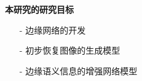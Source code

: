 \documentclass[CJK,aspectratio=169]{beamer}  %
\begin{document}
	\begin{frame}
		{ \yahei \textbf{本研究的研究目标}}
		
		\begin{itemize}
			\item [-]
			边缘网络的开发
			
			\vspace{-0.05cm}
			
			\item [-]
			初步恢复图像的生成模型
	
			\vspace{-0.05cm}
			
			\item [-]
			边缘语义信息的增强网络模型
		\end{itemize}
		
	\end{frame}
	
%		
%			
%			
%			
%		
%		
	
\end{document}
